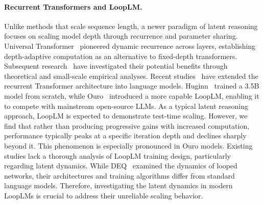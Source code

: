 \paragraph{Recurrent Transformers and LoopLM.}
Unlike methods that scale sequence length, a newer paradigm of latent reasoning focuses on scaling model depth through recurrence and parameter sharing.  Universal Transformer~\citep{dehghani2018universal} pioneered dynamic recurrence across layers, establishing depth-adaptive computation as an alternative to fixed-depth transformers.
Subsequent research~\citep{giannou2023looped,yang2023looped,fan2024looped} have investigated their potential benefits through theoretical and small-scale empirical analyses.
Recent studies~\citep{geiping2025scaling,zhu2025scaling,du2025latent,mcleish2025teaching} have extended the recurrent Transformer architecture into language models. Huginn~\citep{geiping2025scaling} trained a 3.5B model from scratch, while Ouro~\citep{zhu2025scaling} introduced a more capable LoopLM, enabling it to compete with mainstream open-source LLMs. As a typical latent reasoning approach, LoopLM is expected to demonstrate test-time scaling. However, we find that rather than producing progressive gains with increased computation, performance typically peaks at a specific iteration depth and declines sharply beyond it. This phenomenon is especially pronounced in Ouro models.
Existing studies lack a thorough analysis of LoopLM training design, particularly regarding latent dynamics. While DEQ~\citep{bai2019deep,bai2021stabilizing} examined the dynamics of looped networks, their architectures and training algorithms differ from standard language models. Therefore, investigating the latent dynamics in modern LoopLMs is crucial to address their unreliable scaling behavior.
